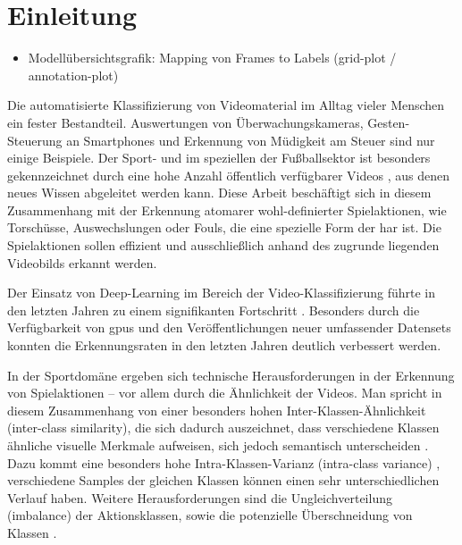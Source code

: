 \chapter{Einleitung}
\label{ch:intro}

\begin{tcolorbox}[title=Todo]
 \begin{itemize}
  \item Modellübersichtsgrafik: Mapping von Frames to Labels (grid-plot / annotation-plot)
 \end{itemize}
 \end{tcolorbox}

Die automatisierte Klassifizierung von Videomaterial im Alltag vieler Menschen ein fester Bestandteil.
Auswertungen von Überwachungskameras, Gesten-Steuerung an Smartphones und Erkennung von Müdigkeit am Steuer sind nur einige Beispiele.
Der Sport- und im speziellen der Fußballsektor ist besonders gekennzeichnet durch eine hohe Anzahl öffentlich verfügbarer Videos \cite{Giancola18}, aus denen neues Wissen abgeleitet werden kann.
Diese Arbeit beschäftigt sich in diesem Zusammenhang mit der Erkennung atomarer wohl-definierter Spielaktionen, wie Torschüsse, Auswechslungen oder Fouls, die eine spezielle Form der \gls{har} ist.
Die Spielaktionen sollen effizient und ausschließlich anhand des zugrunde liegenden Videobilds erkannt werden.

Der Einsatz von Deep-Learning im Bereich der Video-Klassifizierung führte in den letzten Jahren zu einem signifikanten Fortschritt \cite{Abu-Bakar19}.
Besonders durch die Verfügbarkeit von \glspl{gpu} und den Veröffentlichungen neuer umfassender Datensets konnten die Erkennungsraten in den letzten Jahren deutlich verbessert werden. %

In der Sportdomäne ergeben sich technische Herausforderungen in der Erkennung von Spielaktionen -- vor allem durch die Ähnlichkeit der Videos.
Man spricht in diesem Zusammenhang von einer besonders hohen Inter-Klassen-Ähnlichkeit (inter-class similarity), die sich dadurch auszeichnet, dass verschiedene Klassen ähnliche visuelle Merkmale aufweisen, sich jedoch semantisch unterscheiden \cite{Sozykin17}.
Dazu kommt eine besonders hohe Intra-Klassen-Varianz (intra-class variance) \cite{Ballan09}, \dh verschiedene Samples der gleichen Klassen können einen sehr unterschiedlichen Verlauf haben.
Weitere Herausforderungen sind die Ungleichverteilung (imbalance) der Aktionsklassen, sowie die potenzielle Überschneidung von Klassen \cite{Jiang19}.

